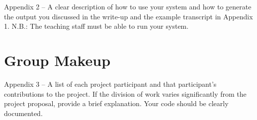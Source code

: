 \documentclass[11pt]{article}
\begin{document}
 Appendix 2 – A clear description of how to use your system and how to generate the output you discussed in the write-up and the example transcript in Appendix 1. N.B.: The teaching staff must be able to run your system.

\section{Group Makeup}

 Appendix 3 – A list of each project participant and that
participant’s contributions to the project. If the division of work
varies significantly from the project proposal, provide a brief
explanation.  Your code should be clearly documented. 



 

\end{document}
